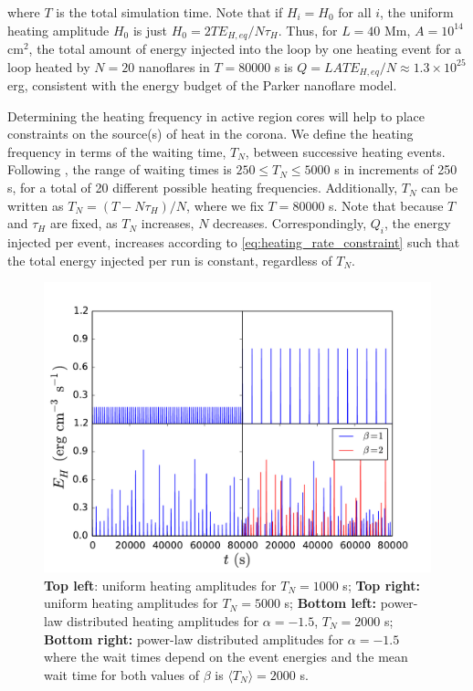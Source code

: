 \documentclass[apj]{emulateapj}
\begin{document}
	where $T$ is the total simulation time. Note that if $H_i=H_0$ for all $i$, the uniform heating amplitude $H_0$ is just $H_0=2TE_{H,eq}/N\tau_H$. Thus, for $L=40$ Mm, $A=10^{14}$ cm$^2$, the total amount of energy injected into the loop by one heating event for a loop heated by $N=20$ nanoflares in $T=80000$ s is $Q=LATE_{H,eq}/N\approx1.3\times10^{25}$ erg, consistent with the energy budget of the Parker nanoflare model. 
	\par Determining the heating frequency in active region cores will help to place constraints on the source(s) of heat in the corona. We define the heating frequency in terms of the waiting time, $T_N$, between successive heating events. Following \citet{cargill_active_2014}, the range of waiting times is $250\le T_N\le5000$ s in increments of 250 s, for a total of 20 different possible heating frequencies. Additionally, $T_N$ can be written as $T_N=(T-N\tau_H)/N$, where we fix $T=80000$ s. Note that because $T$ and $\tau_H$ are fixed, as $T_N$ increases, $N$ decreases. Correspondingly, $Q_i$, the energy injected per event, increases according to \autoref{eq:heating_rate_constraint} such that the total energy injected per run is constant, regardless of $T_N$.
	\begin{figure}
		\centering
		\includegraphics[width=\columnwidth]{figures/heating_functions.pdf}
		\caption{\textbf{Top left}: uniform heating amplitudes for $T_N=1000$ s; \textbf{Top right:} uniform heating amplitudes for $T_N=5000$ s; \textbf{Bottom left:} power-law distributed heating amplitudes for $\alpha=-1.5$, $T_N=2000$ s; \textbf{Bottom right:} power-law distributed amplitudes for $\alpha=-1.5$ where the wait times depend on the event energies and the mean wait time for both values of $\beta$ is $\langle T_N\rangle=2000$ s.}
		\label{fig:heating_funcs}
	\end{figure}
\end{document}
